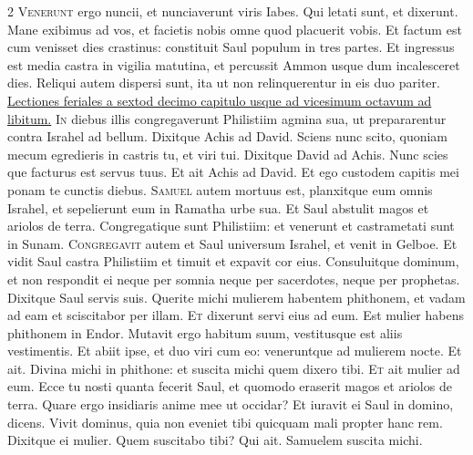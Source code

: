 \begin{multicols*}{2}
\lettrine[lines=2]{\zallmancaps \color{Red} V}{enerunt} ergo nuncii, et nunciaverunt viris Iabes. Qui letati sunt, et dixerunt. Mane exibimus ad vos, et facietis nobis omne quod placuerit vobis. Et factum est cum venisset dies crastinus: constituit Saul populum in tres partes. Et ingressus est media castra in vigilia matutina, et percussit Ammon usque dum incalesceret dies. Reliqui autem dispersi sunt, ita ut non relinquerentur in eis duo pariter.
\newline \ul{Lectiones feriales a sextod decimo capitulo usque ad vicesimum octavum ad libitum.}
{\color{Red} }
\lettrine[lines=2]{\zallmancaps \color{Blue} I}{n} diebus illis congregaverunt Philistiim agmina sua, ut prepararentur contra Israhel ad bellum. Dixitque Achis ad David. Sciens nunc scito, quoniam mecum egredieris in castris tu, et viri tui. Dixitque David ad Achis. Nunc scies que facturus est servus tuus. Et ait Achis ad David. Et ego custodem capitis mei ponam te cunctis diebus.
\lettrine[lines=2]{\zallmancaps \color{Red} S}{amuel} autem mortuus est, planxitque eum omnis Israhel, et sepelierunt eum in Ramatha urbe sua. Et Saul abstulit magos et ariolos de terra. Congregatique sunt Philistiim: et venerunt et castrametati sunt in Sunam.
\lettrine[lines=2]{\zallmancaps \color{Blue} C}{ongregavit} autem et Saul universum Israhel, et venit in Gelboe. Et vidit Saul castra Philistiim et timuit et expavit cor eius. Consuluitque dominum, et non respondit ei neque per somnia neque per sacerdotes, neque per prophetas. Dixitque Saul servis suis. Querite michi mulierem habentem phithonem, et vadam ad eam et sciscitabor per illam.
\lettrine[lines=2]{\zallmancaps \color{Red} E}{t} dixerunt servi eius ad eum. Est mulier habens phithonem in Endor. Mutavit ergo habitum suum, vestitusque est aliis vestimentis. Et abiit ipse, et duo viri cum eo: veneruntque ad mulierem nocte. Et ait. Divina michi in phithone: et suscita michi quem dixero tibi.
\lettrine[lines=2]{\zallmancaps \color{Blue} E}{t} ait mulier ad eum. Ecce tu nosti quanta fecerit Saul, et quomodo eraserit magos et ariolos de terra. Quare ergo insidiaris anime mee ut occidar? Et iuravit ei Saul in domino, dicens. Vivit dominus, quia non eveniet tibi quicquam mali propter hanc rem. Dixitque ei mulier. Quem suscitabo tibi? Qui ait. Samuelem suscita michi.

\end{multicols*}
